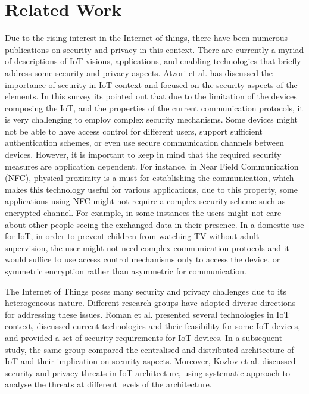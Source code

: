 \documentclass{llncs}
\begin{document}
\section{Related Work}
Due to the rising interest in the Internet of things, there have been numerous publications on security and privacy in this context. There are currently a myriad of descriptions of IoT visions, applications, and enabling technologies \cite{Atzori2010,Ciscoiot,Miorandi2012,Gubbi2013} that briefly address some security and privacy aspects. Atzori et al. \cite{Atzori2010} has discussed the importance of security in IoT context and focused on the security aspects of the elements. In this survey its pointed out that due to the limitation of the devices composing the IoT, and the properties of the current communication protocols, it is very challenging to employ complex security mechanisms. Some devices might not be able to have access control for different users, support sufficient authentication schemes, or even use secure communication channels between devices. However, it is important to keep in mind that the required security measures are application dependent. For instance, in Near Field Communication (NFC), physical proximity is a must for establishing the communication, which makes this technology useful for various applications, due to this property, some applications using NFC might not require a complex security scheme such as encrypted channel. For example, in some instances the users might not care about other people seeing the exchanged data in their presence. In a domestic use for IoT, in order to prevent children from watching TV without adult supervision, the user might not need complex communication protocols and it would suffice to use access control mechanisms only to access the device, or symmetric encryption rather than asymmetric for communication.

The Internet of Things poses many security and privacy challenges\cite{Weber2010} due to its heterogeneous nature. Different research groups have adopted diverse directions for addressing these issues. Roman et al. \cite{Roman2011} presented several technologies in IoT context, discussed current technologies and their feasibility for some IoT devices, and provided a set of security requirements for IoT devices. In a subsequent study, the same group \cite{Roman2013} compared the centralised and distributed architecture of IoT and their implication on security aspects. Moreover, Kozlov et al. \cite{Kozlov2012} discussed security and privacy threats in IoT architecture, using systematic approach to analyse the threats at different levels of the architecture.
\end{document}
